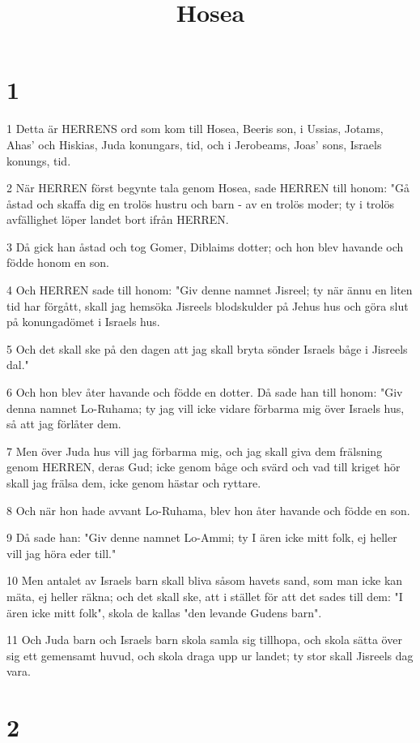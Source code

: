 

\title{Hosea}


\chapter{1}

\par 1 Detta är HERRENS ord som kom till Hosea, Beeris son, i Ussias, Jotams, Ahas' och Hiskias, Juda konungars, tid, och i Jerobeams, Joas' sons, Israels konungs, tid.
\par 2 När HERREN först begynte tala genom Hosea, sade HERREN till honom: "Gå åstad och skaffa dig en trolös hustru och barn - av en trolös moder; ty i trolös avfällighet löper landet bort ifrån HERREN.
\par 3 Då gick han åstad och tog Gomer, Diblaims dotter; och hon blev havande och födde honom en son.
\par 4 Och HERREN sade till honom: "Giv denne namnet Jisreel; ty när ännu en liten tid har förgått, skall jag hemsöka Jisreels blodskulder på Jehus hus och göra slut på konungadömet i Israels hus.
\par 5 Och det skall ske på den dagen att jag skall bryta sönder Israels båge i Jisreels dal."
\par 6 Och hon blev åter havande och födde en dotter. Då sade han till honom: "Giv denna namnet Lo-Ruhama; ty jag vill icke vidare förbarma mig över Israels hus, så att jag förlåter dem.
\par 7 Men över Juda hus vill jag förbarma mig, och jag skall giva dem frälsning genom HERREN, deras Gud; icke genom båge och svärd och vad till kriget hör skall jag frälsa dem, icke genom hästar och ryttare.
\par 8 Och när hon hade avvant Lo-Ruhama, blev hon åter havande och födde en son.
\par 9 Då sade han: "Giv denne namnet Lo-Ammi; ty I ären icke mitt folk, ej heller vill jag höra eder till."
\par 10 Men antalet av Israels barn skall bliva såsom havets sand, som man icke kan mäta, ej heller räkna; och det skall ske, att i stället för att det sades till dem: "I ären icke mitt folk", skola de kallas "den levande Gudens barn".
\par 11 Och Juda barn och Israels barn skola samla sig tillhopa, och skola sätta över sig ett gemensamt huvud, och skola draga upp ur landet; ty stor skall Jisreels dag vara.

\chapter{2}

